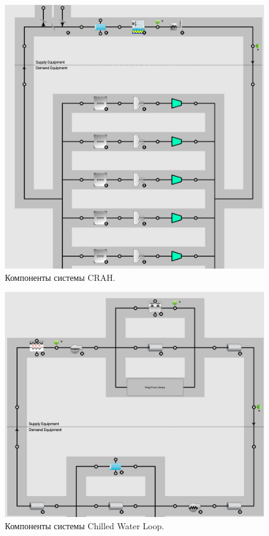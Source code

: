 \documentclass{article}
\begin{document}
\begin{figure}[h!]
\centering
\includegraphics[width=0.95\linewidth]{figures/CRAH1.png}
\caption{Компоненты системы CRAH.}
\label{fig:CRAH1}
\end{figure}

\begin{figure}[h!]
\centering
\includegraphics[width=0.95\linewidth]{figures/CRAH2.png}
\caption{Компоненты системы Chilled Water Loop.}
\label{fig:CRAH2}
\end{figure}
\end{document}
